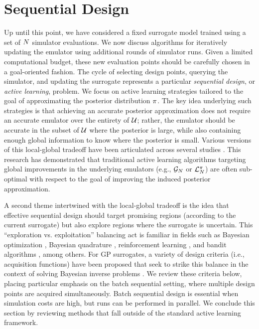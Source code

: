 \documentclass[12pt]{article}
\begin{document}
\section{Sequential Design} \label{sec:seq-design}
Up until this point, we have considered a fixed surrogate model trained using a set of
$\Ndesign$ simulator evaluations. We now discuss algorithms for iteratively 
updating the emulator using additional rounds of simulator runs.
Given a limited computational budget, these new evaluation points should be carefully chosen in 
a goal-oriented fashion. The cycle of selecting design points, querying the simulator, 
and updating the surrogate represents a particular \textit{sequential design},
or \textit{active learning}, problem. We focus on active learning strategies
tailored to the goal of approximating the posterior distribution $\postDens$. The key
idea underlying such strategies is that achieving an accurate posterior 
approximation does not require an accurate emulator over the entirety of $\parSpace$;
rather, the emulator should be accurate in the subset of $\parSpace$ where the 
posterior is large, while also containing enough global information to know where
the posterior is small. Various versions of this local-global tradeoff have been articulated
across several studies \citep{StuartTeck2, gp_surrogates_random_exploration,SinsbeckNowak,Surer2023sequential,adaptiveMultimodal}. 
This research has demonstrated that traditional active learning algorithms targeting global improvements 
in the underlying emulators (e.g., $\fwdEm[\Ndesign]$ or $\lpostEm[\Ndesign]$) are often sub-optimal with 
respect to the goal of improving the induced posterior approximation.

A second theme intertwined with the local-global tradeoff is the idea that effective 
sequential design should target promising regions (according to the current surrogate)
but also explore regions where the surrogate is uncertain. 
This ``exploration vs. exploitation'' balancing act is familiar in fields such as 
Bayesian optimization \citep{reviewBayesOpt}, Bayesian quadrature 
\citep{BayesQuadrature,BayesQuadratureAL,BayesQuadRatios,quadratureLogGP}, 
reinforcement learning \citep{BadiaRL,LiuRL}, and bandit algorithms \citep{banditsEmpirical,LattimoreBandits}, 
among others. For GP surrogates, a variety of design criteria (i.e., acquisition functions) have been 
proposed that seek to strike this balance in the context of solving Bayesian inverse problems \citep{SinsbeckNowak,Surer2023sequential,KandasamyActiveLearning2015,weightedIVAR,
VehtariParallelGP,VillaniAdaptiveGP}. We review these criteria below, placing particular 
emphasis on the batch sequential setting, where multiple design points are acquired simultaneously.
Batch sequential design is essential when simulation costs are high, but runs can be performed in parallel.
We conclude this section by reviewing methods that fall outside of the standard active learning 
framework.
\end{document}
